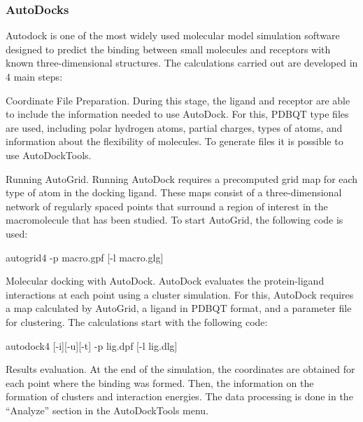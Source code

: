 \documentclass[11pt, letterpaper, english]{article}
\begin{document}
\subsubsection{AutoDocks}
\par{Autodock is one of the most widely used molecular model simulation software designed to predict the binding between small molecules and receptors with known three-dimensional structures. The calculations carried out are developed in 4 main steps:}
\vspace{0.4 cm}

\par{Coordinate File Preparation. 
During this stage, the ligand and receptor are able to include the information needed to use AutoDock. For this, PDBQT type files are used, including polar hydrogen atoms, partial charges,  types of atoms, and information about the flexibility of molecules. To generate files it is possible to use AutoDockTools.}
    \par{Running AutoGrid.
 Running AutoDock requires a precomputed grid map for each type of atom in the docking ligand. These maps consist of a three-dimensional network of regularly spaced points that surround a region of interest in the macromolecule that has been studied. To start AutoGrid, the following code is used:}
    
\vspace{0.4 cm}
    autogrid4 -p macro.gpf [-l macro.glg]
\vspace{0.4 cm}

    \par{Molecular docking with AutoDock. AutoDock evaluates the protein-ligand interactions at each point using a cluster simulation. For this, AutoDock requires a map calculated by AutoGrid, a ligand in PDBQT format, and a parameter file for clustering. The calculations start with the following code:}
\vspace{0.4 cm}

autodock4 [-i][-u][-t] -p lig.dpf [-l lig.dlg]

\vspace{0.4 cm}

\par{Results evaluation.
At the end of the simulation, the coordinates are obtained for each point where the binding was formed. Then, the information on the formation of clusters and interaction energies. The data processing is done in the “Analyze” section in the AutoDockTools menu.}

\newpage
\end{document}
